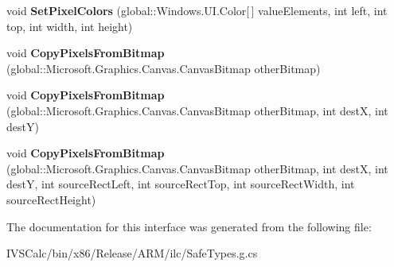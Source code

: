 \begin{DoxyCompactItemize}
\item 
\mbox{\label{interface_microsoft_1_1_graphics_1_1_canvas_1_1_i_canvas_bitmap_ad139947e5dfa06e8b880c01a19016cf7}} 
void {\bfseries Set\+Pixel\+Colors} (global\+::\+Windows.\+U\+I.\+Color\mbox{[}$\,$\mbox{]} value\+Elements, int left, int top, int width, int height)
\item 
\mbox{\label{interface_microsoft_1_1_graphics_1_1_canvas_1_1_i_canvas_bitmap_a6e4c4209ff55c072d09a51c00a9d4653}} 
void {\bfseries Copy\+Pixels\+From\+Bitmap} (global\+::\+Microsoft.\+Graphics.\+Canvas.\+Canvas\+Bitmap other\+Bitmap)
\item 
\mbox{\label{interface_microsoft_1_1_graphics_1_1_canvas_1_1_i_canvas_bitmap_a5ab0cddef05eb80cffded7b872aacc34}} 
void {\bfseries Copy\+Pixels\+From\+Bitmap} (global\+::\+Microsoft.\+Graphics.\+Canvas.\+Canvas\+Bitmap other\+Bitmap, int destX, int destY)
\item 
\mbox{\label{interface_microsoft_1_1_graphics_1_1_canvas_1_1_i_canvas_bitmap_a6300f60ab1f71c5032c2680ae66ec957}} 
void {\bfseries Copy\+Pixels\+From\+Bitmap} (global\+::\+Microsoft.\+Graphics.\+Canvas.\+Canvas\+Bitmap other\+Bitmap, int destX, int destY, int source\+Rect\+Left, int source\+Rect\+Top, int source\+Rect\+Width, int source\+Rect\+Height)
\end{DoxyCompactItemize}


The documentation for this interface was generated from the following file\+:\begin{DoxyCompactItemize}
\item 
I\+V\+S\+Calc/bin/x86/\+Release/\+A\+R\+M/ilc/Safe\+Types.\+g.\+cs\end{DoxyCompactItemize}
